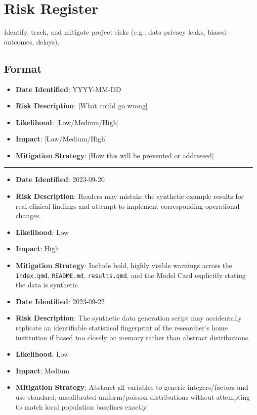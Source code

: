 \documentclass[
]{report}
\author{}
\date{}
\providecommand{\tightlist}{%
  \setlength{\itemsep}{0pt}\setlength{\parskip}{0pt}}
\renewcommand*\contentsname{Table of contents}
\newcommand\contentsname{Table of contents}
\begin{document}
\renewcommand*\contentsname{Table of contents}
{
\hypersetup{linkcolor=}
\setcounter{tocdepth}{2}
\tableofcontents
}

\chapter{Risk Register}\label{risk-register}

Identify, track, and mitigate project risks (e.g., data privacy leaks,
biased outcomes, delays).

\section{Format}\label{format}

\begin{itemize}
\tightlist
\item
  \textbf{Date Identified}: YYYY-MM-DD
\item
  \textbf{Risk Description}: {[}What could go wrong{]}
\item
  \textbf{Likelihood}: {[}Low/Medium/High{]}
\item
  \textbf{Impact}: {[}Low/Medium/High{]}
\item
  \textbf{Mitigation Strategy}: {[}How this will be prevented or
  addressed{]}
\end{itemize}

\begin{center}\rule{0.5\linewidth}{0.5pt}\end{center}

\begin{itemize}
\item
  \textbf{Date Identified}: 2023-09-20
\item
  \textbf{Risk Description}: Readers may mistake the synthetic example
  results for real clinical findings and attempt to implement
  corresponding operational changes.
\item
  \textbf{Likelihood}: Low
\item
  \textbf{Impact}: High
\item
  \textbf{Mitigation Strategy}: Include bold, highly visible warnings
  across the \texttt{index.qmd}, \texttt{README.md},
  \texttt{results.qmd}, and the Model Card explicitly stating the data
  is synthetic.
\item
  \textbf{Date Identified}: 2023-09-22
\item
  \textbf{Risk Description}: The synthetic data generation script may
  accidentally replicate an identifiable statistical fingerprint of the
  researcher's home institution if based too closely on memory rather
  than abstract distributions.
\item
  \textbf{Likelihood}: Low
\item
  \textbf{Impact}: Medium
\item
  \textbf{Mitigation Strategy}: Abstract all variables to generic
  integers/factors and use standard, uncalibrated uniform/poisson
  distributions without attempting to match local population baselines
  exactly.
\end{itemize}
\end{document}
